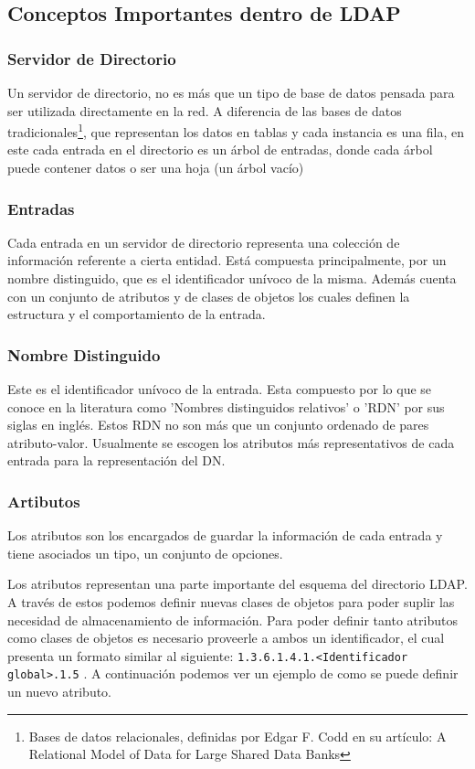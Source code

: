 \newpage

\subsection{Conceptos Importantes dentro de LDAP}

\subsubsection{Servidor de Directorio}
Un servidor de directorio, no es más que un tipo de base de datos pensada para ser utilizada 
directamente en la red. A diferencia de las bases de datos tradicionales\footnote{Bases de 
datos relacionales, definidas por Edgar F. Codd en su artículo: A Relational Model of Data 
for Large Shared Data Banks}, que representan los datos en tablas y cada instancia es una 
fila, en este cada entrada en el directorio es un árbol de entradas, donde cada árbol puede 
contener datos o ser una hoja (un árbol vacío)
	
\subsubsection{Entradas}
Cada entrada en un servidor de directorio representa una colección de información referente 
a cierta entidad. Está compuesta principalmente, por un nombre distinguido, que es el 
identificador unívoco de la misma. Además cuenta con un conjunto de atributos y de clases de 
objetos los cuales definen la estructura y el comportamiento de la entrada.

\subsubsection{Nombre Distinguido} 
Este es el identificador unívoco de la entrada. Esta compuesto por lo que se conoce en la 
literatura como 'Nombres distinguidos relativos' o 'RDN' por sus siglas en inglés. Estos RDN 
no son más que un conjunto ordenado de pares atributo-valor. Usualmente se escogen los 
atributos más representativos de cada entrada para la representación del DN.

\subsubsection{Artibutos}
Los atributos son los encargados de guardar la información de cada entrada y tiene asociados 
un tipo, un conjunto de opciones.

Los atributos representan una parte importante del esquema del directorio LDAP. A través de 
estos podemos definir nuevas clases de objetos para poder suplir las necesidad de 
almacenamiento de información. Para poder definir tanto atributos como clases de objetos es 
necesario proveerle a ambos un identificador, el cual presenta un formato similar al 
siguiente: \verb|1.3.6.1.4.1.<Identificador global>.1.5| . A continuación podemos ver un ejemplo de 
como se puede definir un nuevo atributo.


